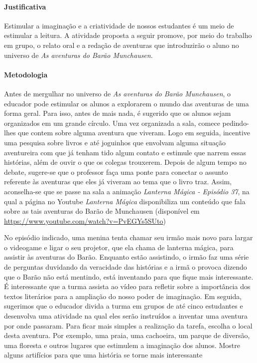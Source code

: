 \documentclass[11pt]{extarticle}
\begin{document}
\paragraph{Justificativa} Estimular a imaginação e a criatividade de nossos estudantes é um meio de estimular a leitura. A atividade proposta a seguir promove, por meio do trabalho em grupo, o relato oral e a redação de aventuras que introduzirão o aluno no universo de \textit{As aventuras do Barão Munchausen}.    

\paragraph{Metodologia} Antes de mergulhar no universo de \textit{As aventuras do Barão Munchausen}, o educador pode estimular os alunos a explorarem o mundo das aventuras de uma forma geral. Para isso, antes de mais nada, é sugerido que os alunos sejam organizados em um grande círculo. Uma vez organizada a sala, comece pedindo-lhes que contem sobre alguma aventura que viveram. Logo em seguida, incentive uma pesquisa sobre livros e até joguinhos que envolvam alguma situação aventureira com que já tenham tido algum contato e estimule que narrem essas histórias, além de ouvir o que os colegas trouxerem. Depois de algum tempo no debate, sugere-se que o professor faça uma ponte para conectar o assunto referente às aventuras que eles já viveram ao tema que o livro traz. Assim, aconselha-se que se passe na sala a animação \textit{Lanterna Mágica - Episódio 37}, na qual a página no Youtube \textit{Lanterna Mágica} disponibiliza um conteúdo que fala sobre as tais aventuras do Barão de Munchausen (disponível em \url{https://www.youtube.com/watch?v=PvEGYs5SUto})


No episódio indicado, uma menina tenta chamar seu irmão mais novo para largar o videogame e ligar o seu projetor, que ela chama de lanterna mágica, para assistir às aventuras do Barão. Enquanto estão assistindo, o irmão faz uma série de perguntas duvidando da veracidade das histórias e a irmã o provoca dizendo que o Barão não está mentindo, está inventando para que fique mais interessante. É interessante que a turma assista ao vídeo para refletir sobre a importância dos textos literários para a ampliação do nosso poder de imaginação. Em seguida, sugerimos que o educador divida a turma em grupos de até cinco estudantes e desenvolva uma atividade na qual eles serão instruídos a inventar uma aventura por onde passaram. Para ficar mais simples a realização da tarefa, escolha o local desta aventura. Por exemplo, uma praia, uma cachoeira, um parque de diversão, uma floresta e outros lugares que estimulem a imaginação dos alunos. Mostre alguns artifícios para que uma história se torne mais interessante 
\end{document}
